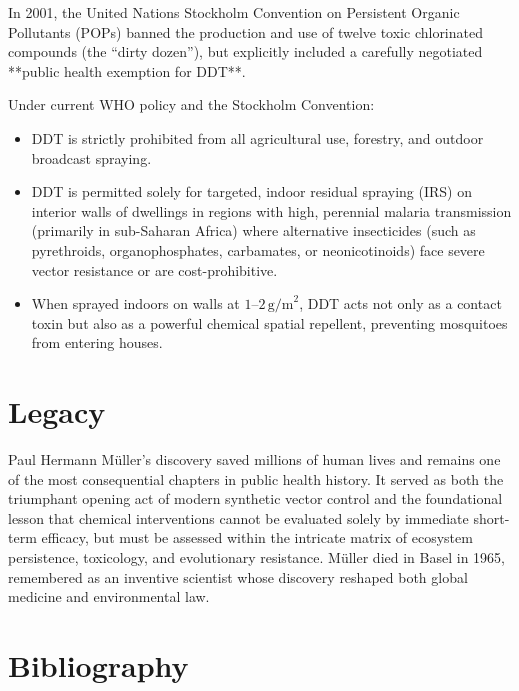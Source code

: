 In 2001, the United Nations Stockholm Convention on Persistent Organic Pollutants (POPs) banned the production and use of twelve toxic chlorinated compounds (the ``dirty dozen''), but explicitly included a carefully negotiated **public health exemption for DDT**.

Under current WHO policy and the Stockholm Convention:
\begin{itemize}
    \item DDT is strictly prohibited from all agricultural use, forestry, and outdoor broadcast spraying.
    \item DDT is permitted solely for targeted, indoor residual spraying (IRS) on interior walls of dwellings in regions with high, perennial malaria transmission (primarily in sub-Saharan Africa) where alternative insecticides (such as pyrethroids, organophosphates, carbamates, or neonicotinoids) face severe vector resistance or are cost-prohibitive.
    \item When sprayed indoors on walls at $1\text{--}2\,\text{g/m}^2$, DDT acts not only as a contact toxin but also as a powerful chemical spatial repellent, preventing mosquitoes from entering houses.
\end{itemize}

\section{Legacy}

Paul Hermann Müller's discovery saved millions of human lives and remains one of the most consequential chapters in public health history. It served as both the triumphant opening act of modern synthetic vector control and the foundational lesson that chemical interventions cannot be evaluated solely by immediate short-term efficacy, but must be assessed within the intricate matrix of ecosystem persistence, toxicology, and evolutionary resistance. Müller died in Basel in 1965, remembered as an inventive scientist whose discovery reshaped both global medicine and environmental law.

\section{Bibliography}

